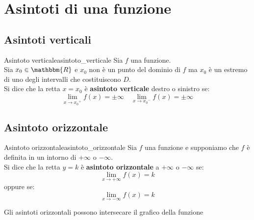 \documentclass[12pt]{report}
\newcounter{definition}
\newcommand{\nmu}{}
\begin{document}
 	\section{Asintoti di una funzione}
 	\subsection{Asintoti verticali}
 	\begin{definition}{\nmu Asintoto verticale}{asintoto_verticale}
 		Sia $f$ una funzione. \\
 		Sia $x_0 \in \mathbbm{R}$ e $x_0$ non è un punto del dominio di $f$ ma $x_0$ è un estremo di uno degli intervalli che costituiscono $D$. \\

 		Si dice che la retta $x = x_0$ è \textbf{asintoto verticale} destro o sinistro se:
 		\[
 		\lim_{x \to {x_0}^+}f(x)=\pm\infty \quad \lim_{x \to {x_0}^-}f(x) = \pm\infty
 		\]
 	\end{definition}
 	\subsection{Asintoto orizzontale}
 	\begin{definition}{\nmu Asintoto orizzontale}{asintoto_orizzontale}
 		Sia $f$ una funzione e supponiamo che $f$ è definita in un intorno di $+\infty$ o  $-\infty$. \\
 		Si dice che la retta $y = k$ è \textbf{asintoto orizzontale} a $+\infty$ o $-\infty$ se:
 		\[
 		\lim_{x \to +\infty}f(x) = k
 		\]
 		oppure se:
 		\[
 		\lim_{x \to -\infty}f(x) = k
 		\]
 	\end{definition}
 	\begin{note}{}{}
 		Gli asintoti orizzontali possono intersecare il grafico della funzione
  	\end{note}
\end{document}
